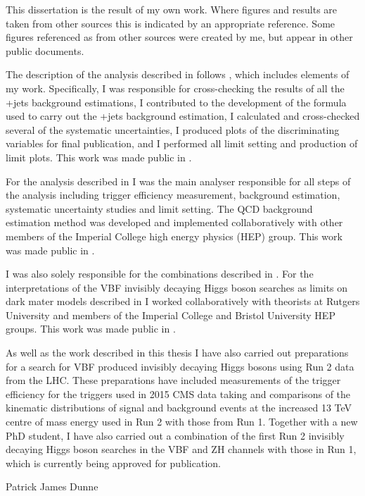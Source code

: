 \begin{declaration}
  This dissertation is the result of my own work. Where figures and results are taken from other sources this is indicated by an appropriate reference. Some figures referenced as from other sources were created by me, but appear in other public documents. 

The description of the analysis described in  follows , which includes elements of my work. Specifically, I was responsible for cross-checking the results of all the \PW+jets background estimations, I contributed to the development of the formula used to carry out the \PZ+jets background estimation, I calculated and cross-checked several of the systematic uncertainties, I produced plots of the discriminating variables for final publication, and I performed all limit setting and production of limit plots. This work was made public in .

For the analysis described in  I was the main analyser responsible for all steps of the analysis including trigger efficiency measurement, background estimation, systematic uncertainty studies and limit setting. The QCD background estimation method was developed and implemented collaboratively with other members of the Imperial College high energy physics (HEP) group. This work was made public in .

I was also solely responsible for the combinations described in . For the interpretations of the VBF invisibly decaying Higgs boson searches as limits on dark mater models described in  I worked collaboratively with theorists at Rutgers University and members of the Imperial College and Bristol University HEP groups. This work was made public in .

As well as the work described in this thesis I have also carried out preparations for a search for VBF produced invisibly decaying Higgs bosons using Run 2 data from the LHC. These preparations have included measurements of the trigger efficiency for the triggers used in 2015 CMS data taking and comparisons of the kinematic distributions of signal and background events at the increased 13 TeV centre of mass energy used in Run 2 with those from Run 1. Together with a new PhD student, I have also carried out a combination of the first Run 2 invisibly decaying Higgs boson searches in the VBF and ZH channels with those in Run 1, which is currently being approved for publication.


  \vspace*{1cm}
  \begin{flushright}
    Patrick James Dunne
  \end{flushright}
\end{declaration}


